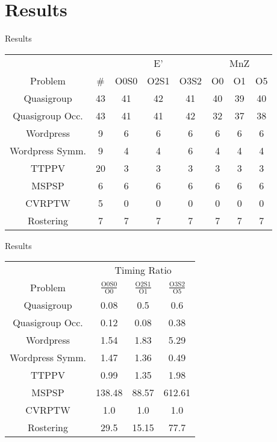 \documentclass{beamer}
\begin{document}
\section*{Results}
\begin{frame}{Results}
{\footnotesize{

\begin{table}[h!]
    \centering
    \begin{tabular}{c|c|ccc|ccc}
    & & \multicolumn{3}{c|}{E'} & \multicolumn{3}{c}{MnZ} \\
    Problem & \# & O0S0 & O2S1 & O3S2 & O0 & O1 & O5 \\ \hline
    Quasigroup           & 43 & 41 & 42 & 41 & 40 & 39 & 40 \\        
    Quasigroup Occ.      & 43 & 41 & 41 & 42 & 32 & 37 & 38 \\
    Wordpress            & 9  & 6  & 6  & 6  & 6  & 6  & 6  \\               
    Wordpress Symm.      & 9  & 4  & 4  & 6  & 4  & 4  & 4  \\ 
    TTPPV                & 20 & 3  & 3  & 3  & 3  & 3  & 3  \\ 
    MSPSP                & 6  & 6  & 6  & 6  & 6  & 6  & 6  \\ 
    CVRPTW               & 5  & 0  & 0  & 0  & 0  & 0  & 0  \\ 
    Rostering            & 7  & 7  & 7  & 7  & 7  & 7  & 7    
    \end{tabular}
\end{table}}}
\end{frame}
\begin{frame}{Results}
{\footnotesize{

\begin{table}[h!]
    \centering
    \begin{tabular}{c|ccc}
    & \multicolumn{3}{c}{Timing Ratio} \\
    Problem & $\frac{\text{O0S0}}{\text{O0}}$ & $\frac{\text{O2S1}}{\text{O1}}$ & $\frac{\text{O3S2}}{\text{O5}}$ \\ \hline
    Quasigroup           & 0.08      & 0.5       & 0.6   \\        
    Quasigroup Occ.      & 0.12      & 0.08      & 0.38  \\
    Wordpress            & 1.54      & 1.83      & 5.29  \\               
    Wordpress Symm.      & 1.47      & 1.36      & 0.49  \\ 
    TTPPV                & 0.99      & 1.35      & 1.98  \\ 
    MSPSP                & 138.48    & 88.57     & 612.61\\ 
    CVRPTW               & 1.0       & 1.0       & 1.0   \\ 
    Rostering            & 29.5      & 15.15     & 77.7   
    \end{tabular}
\end{table}}}
\end{frame}
    
\end{document}
